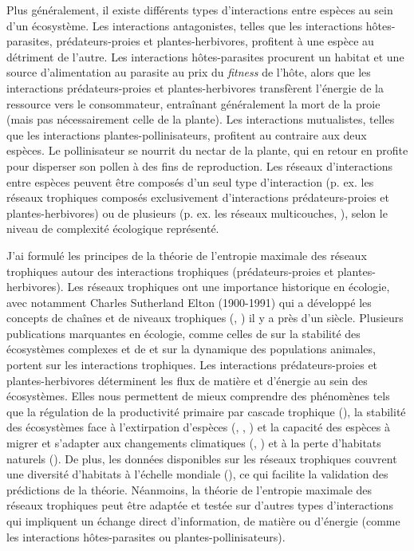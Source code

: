 Plus généralement, il existe différents types d'interactions entre espèces au
sein d'un écosystème. Les interactions antagonistes, telles que les interactions
hôtes-parasites, prédateurs-proies et plantes-herbivores, profitent à une espèce
au détriment de l'autre. Les interactions hôtes-parasites procurent un habitat
et une source d'alimentation au parasite au prix du \textit{fitness} de l'hôte,
alors que les interactions prédateurs-proies et plantes-herbivores transfèrent
l'énergie de la ressource vers le consommateur, entraînant généralement la mort
de la proie (mais pas nécessairement celle de la plante). Les interactions
mutualistes, telles que les interactions plantes-pollinisateurs, profitent au
contraire aux deux espèces. Le pollinisateur se nourrit du nectar de la plante,
qui en retour en profite pour disperser son pollen à des fins de reproduction.
Les réseaux d'interactions entre espèces peuvent être composés d'un seul type
d'interaction (p. ex. les réseaux trophiques composés exclusivement
d'interactions prédateurs-proies et plantes-herbivores) ou de plusieurs (p. ex.
les réseaux multicouches, \cite{Pilosof2017Multilayer}), selon le niveau de
complexité écologique représenté.

J'ai formulé les principes de la théorie de l'entropie maximale des réseaux
trophiques autour des interactions trophiques (prédateurs-proies et
plantes-herbivores). Les réseaux trophiques ont une importance historique en
écologie, avec notamment Charles Sutherland Elton (1900-1991) qui a développé
les concepts de chaînes et de niveaux trophiques (\cite{Elton1927Animal},
\cite{Elton1958Ecology}) il y a près d'un siècle. Plusieurs publications
marquantes en écologie, comme celles de \cite{May1972Will} sur la stabilité des
écosystèmes complexes et de \cite{Lotka1925Elements} et
\cite{Volterra1927Fluctuations} sur la dynamique des populations animales,
portent sur les interactions trophiques. Les interactions prédateurs-proies et
plantes-herbivores déterminent les flux de matière et d'énergie au sein des
écosystèmes. Elles nous permettent de mieux comprendre des phénomènes tels que
la régulation de la productivité primaire par cascade trophique
(\cite{Carpenter1987Regulation}), la stabilité des écosystèmes face à
l'extirpation d'espèces (\cite{Dunne2002Network}, \cite{Srinivasan2007Response},
\cite{Staniczenko2010Structural}) et la capacité des espèces à migrer et
s'adapter aux changements climatiques (\cite{Tylianakis2008Global},
\cite{Gilman2010Framework}) et à la perte d'habitats naturels
(\cite{Evans2013Robustness}). De plus, les données disponibles sur les réseaux
trophiques couvrent une diversité d'habitats à l'échelle mondiale
(\cite{Poisot2021Global}), ce qui facilite la validation des prédictions de la
théorie. Néanmoins, la théorie de l'entropie maximale des réseaux trophiques
peut être adaptée et testée sur d'autres types d'interactions qui impliquent un
échange direct d'information, de matière ou d'énergie (comme les interactions
hôtes-parasites ou plantes-pollinisateurs).

